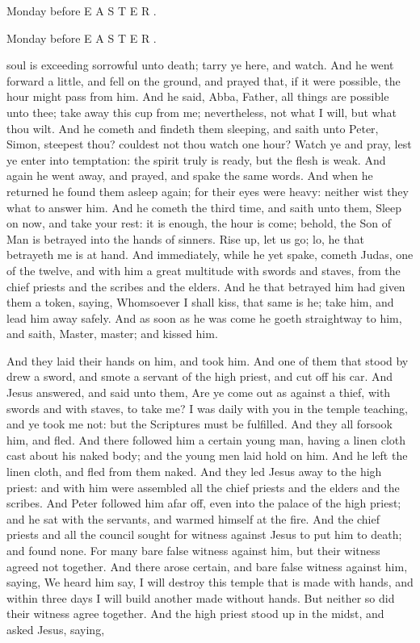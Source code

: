 Monday before E A S T E R .

Monday before E A S T E R .

soul is exceeding sorrowful unto death; tarry ye here, and watch. And he went forward a little, and fell on the ground, and prayed that, if it were possible, the hour might pass from him. And he said, Abba, Father, all things are possible unto thee; take away this cup from me; nevertheless, not what I will, but what thou wilt. And he cometh and findeth them sleeping, and saith unto Peter, Simon, steepest thou? couldest not thou watch one hour? Watch ye and pray, lest ye enter into temptation: the spirit truly is ready, but the flesh is weak. And again he went away, and prayed, and spake the same words. And when he returned he found them asleep again; for their eyes were heavy: neither wist they what to answer him. And he cometh the third time, and saith unto them, Sleep on now, and take your rest: it is enough, the hour is come; behold, the Son of Man is betrayed into the hands of sinners. Rise up, let us go; lo, he that betrayeth me is at hand. And immediately, while he yet spake, cometh Judas, one of the twelve, and with him a great multitude with swords and staves, from the chief priests and the scribes and the elders. And he that betrayed him had given them a token, saying, Whomsoever I shall kiss, that same is he; take him, and lead him away safely. And as soon as he was come he goeth straightway to him, and saith, Master, master; and kissed him.

And they laid their hands on him, and took him. And one of them that stood by drew a sword, and smote a servant of the high priest, and cut off his car. And Jesus answered, and said unto them, Are ye come out as against a thief, with swords and with staves, to take me? I was daily with you in the temple teaching, and ye took me not: but the Scriptures must be fulfilled. And they all forsook him, and fled. And there followed him a certain young man, having a linen cloth cast about his naked body; and the young men laid hold on him. And he left the linen cloth, and fled from them naked. And they led Jesus away to the high priest: and with him were assembled all the chief priests and the elders and the scribes. And Peter followed him afar off, even into the palace of the high priest; and he sat with the servants, and warmed himself at the fire. And the chief priests and all the council sought for witness against Jesus to put him to death; and found none. For many bare false witness against him, but their witness agreed not together. And there arose certain, and bare false witness against him, saying, We heard him say, I will destroy this temple that is made with hands, and within three days I will build another made without hands. But neither so did their witness agree together. And the high priest stood up in the midst, and asked Jesus, saying,

